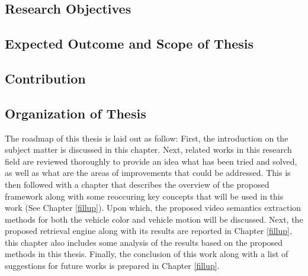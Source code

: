 \subsection{Research Objectives}


\subsection{Expected Outcome and Scope of Thesis}
\label{subsec:scope}



\subsection{Contribution}

\subsection{Organization of Thesis}

The roadmap of this thesis is laid out as follow: First, the introduction on the subject matter is discussed in this chapter. Next, related works in this research field are reviewed thoroughly to provide an idea what has been tried and solved, as well as what are the areas of improvements that could be addressed. This is then followed with a chapter that describes the overview of the proposed framework along with some reoccuring key concepts that will be used in this work (See Chapter \ref{fillup}). Upon which, the proposed video semantics extraction methods for both the vehicle color and vehicle motion will be discussed. Next, the proposed retrieval engine along with its results are reported in Chapter \ref{fillup}, this chapter also includes some analysis of the results based on the proposed methods in this thesis. Finally, the conclusion of this work along with a list of suggestions for future works is prepared in Chapter \ref{fillup}. 
